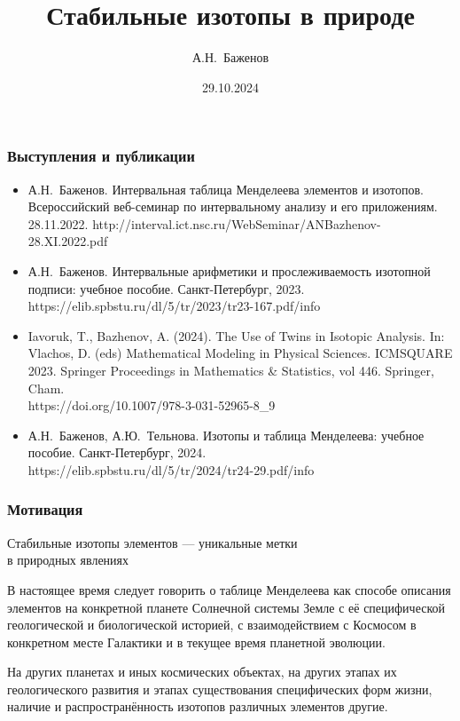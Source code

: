 \documentclass{beamer}
\title{Стабильные изотопы в природе} %
\author{А.Н.~Баженов}
\institute{%
ФТИ им.А.Ф.Иоффе РАН\\
СПбПУ Петра Великого, Физмех\\
\bigskip	
ДОПОЛНИТЕЛЬНАЯ ПРОФЕССИОНАЛЬНАЯ ПРОГРАММА ПОВЫШЕНИЯ КВАЛИФИКАЦИИ\\
<<Новейшие достижения физики и математического моделирования>> 
}
\date{29.10.2024} %
\begin{document}
\begin{frame}
\titlepage %
\end{frame}



	



\begin{frame}
	\frametitle{Выступления и публикации}
{\small		
\begin{itemize}
	\item А.Н.~Баженов. Интервальная таблица Менделеева элементов и изотопов. 
	Всероссийский веб-семинар по интервальному анализу и его приложениям. 28.11.2022.
	http://interval.ict.nsc.ru/WebSeminar/ANBazhenov-28.XI.2022.pdf
	\item А.Н.~Баженов.	Интервальные арифметики и прослеживаемость изотопной подписи: учебное пособие. Санкт-Петербург, 2023.\\
	https://elib.spbstu.ru/dl/5/tr/2023/tr23-167.pdf/info
	\item Iavoruk, T., Bazhenov, A. (2024). The Use of Twins in Isotopic Analysis. In: Vlachos, D. (eds) Mathematical Modeling in Physical Sciences. ICMSQUARE 2023. Springer Proceedings in Mathematics \& Statistics, vol 446. Springer, Cham.\\ https://doi.org/10.1007/978-3-031-52965-8\_9
	\item А.Н.~Баженов, А.Ю.~Тельнова.	Изотопы и таблица Менделеева: учебное пособие. Санкт-Петербург, 2024.\\
	https://elib.spbstu.ru/dl/5/tr/2024/tr24-29.pdf/info
\end{itemize}
}	

\end{frame}

\begin{frame}
	\frametitle{Мотивация}

{\large
\begin{center} Стабильные изотопы элементов --- уникальные метки \\в природных явлениях
\end{center}
}		

В настоящее время следует говорить о  таблице Менделеева как способе описания элементов на конкретной планете Солнечной системы Земле с её специфической геологической и биологической историей, с взаимодействием с Космосом в конкретном месте Галактики и в текущее время планетной эволюции.

\bigskip
На других планетах и иных космических объектах, на других этапах их геологического развития и этапах существования специфических форм жизни, наличие и распространённость изотопов различных элементов другие. 
	
\end{frame}
\end{document}
